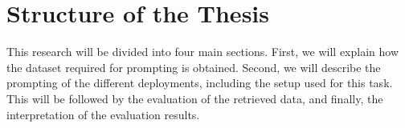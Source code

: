 \section{Structure of the Thesis}

This research will be divided into four main sections. First, we will explain how the dataset required for prompting is obtained. Second, we will describe the prompting of the different deployments, including the setup used for this task. This will be followed by the evaluation of the retrieved data, and finally, the interpretation of the evaluation results.

